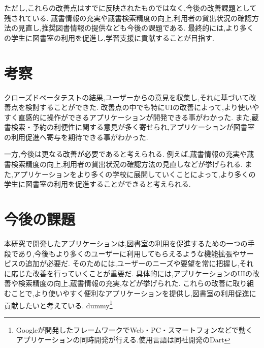 \documentclass[twocolumn]{jsarticle}
\begin{document}
ただし,これらの改善点はすでに反映されたものではなく,今後の改善課題として残されている.
蔵書情報の充実や蔵書検索精度の向上,利用者の貸出状況の確認方法の見直し,推奨図書情報の提供なども今後の課題である.
最終的には,より多くの学生に図書室の利用を促進し,学習支援に貢献することが目指す.
\newpage
\section{考察}
クローズドベータテストの結果,ユーザーからの意見を収集し,それに基づいて改善点を検討することができた.
改善点の中でも特にUIの改善によって,より使いやすく直感的に操作ができるアプリケーションが開発できる事がわかった.
また,蔵書検索・予約の利便性に関する意見が多く寄せられ,アプリケーションが図書室の利用促進へ寄与を期待できる事がわかった.

一方,今後は更なる改善が必要であると考えられる.
例えば,蔵書情報の充実や蔵書検索精度の向上,利用者の貸出状況の確認方法の見直しなどが挙げられる.
また,アプリケーションをより多くの学校に展開していくことによって,より多くの学生に図書室の利用を促進することができると考えられる.
\section{今後の課題}
本研究で開発したアプリケーションは,図書室の利用を促進するための一つの手段であり,今後もより多くのユーザーに利用してもらえるような機能拡張やサービスの追加が必要だ.
そのためには,ユーザーのニーズや要望を常に把握し,それに応じた改善を行っていくことが重要だ.
具体的には,アプリケーションのUIの改善や検索精度の向上,蔵書情報の充実,などが挙げられた.
これらの改善に取り組むことで,より使いやすく便利なアプリケーションを提供し,図書室の利用促進に貢献したいと考えている.
\color{white}
dummy\footnote[1]{Googleが開発したフレームワークでWeb・PC・スマートフォンなどで動くアプリケーションの同時開発が行える.使用言語は同社開発のDart}
\end{document}
